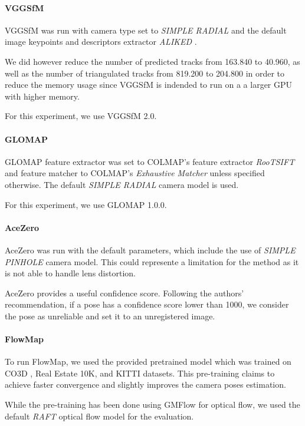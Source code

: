 \paragraph{VGGSfM}
VGGSfM was run with camera type set to \textit{SIMPLE RADIAL} and the default image keypoints and descriptors extractor \textit{ALIKED} \cite{Zhao2023ALIKED}.

We did however reduce the number of predicted tracks from 163.840 to 40.960, as well as the number of triangulated tracks from 819.200 to 204.800 
in order to reduce the memory usage since VGGSfM is indended to run on a a larger GPU with higher memory.

For this experiment, we use VGGSfM 2.0.

\paragraph{GLOMAP}
GLOMAP feature extractor was set to COLMAP's feature extractor \textit{RooTSIFT} \cite{arrandjelovic2012three} and feature matcher to COLMAP's \textit{Exhaustive Matcher} unless specified otherwise.
The default \textit{SIMPLE RADIAL} camera model is used.

For this experiment, we use GLOMAP 1.0.0.

\paragraph{AceZero}
AceZero was run with the default parameters, which include the use of \textit{SIMPLE PINHOLE} camera model. 
This could represente a limitation for the method as it is not able to handle lens distortion.

AceZero provides a useful confidence score. Following the authors' recommendation, if a pose has a confidence score lower than 1000, we consider the pose as unreliable and set it to an unregistered image.

\paragraph{FlowMap}
To run FlowMap, we used the provided pretrained model which was trained on CO3D \cite{reizenstein21co3d}, Real Estate 10K, and KITTI \cite{geiger2012kitti} datasets.
This pre-training claims to achieve faster convergence and slightly improves the camera poses estimation.

While the pre-training has been done using GMFlow \cite{xu2022gmflow} for optical flow, we used the default \textit{RAFT} \cite{teed2020raft} optical flow model for the evaluation.

